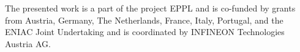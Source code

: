 The presented work is a part of the project EPPL and is co-funded by grants from Austria, Germany, The Netherlands, France, Italy, Portugal, and the ENIAC Joint Undertaking and is coordinated by INFINEON Technologies Austria AG.
